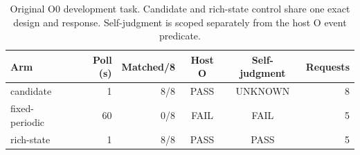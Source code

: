 \begin{table}[htbp]
\centering\small
\caption{Original O0 development task. Candidate and rich-state control share one exact design and response. Self-judgment is scoped separately from the host O event predicate.}
\label{tab:o0}
\begin{tabular}{@{}lrrccr@{}}\toprule
Arm & Poll (s) & Matched/8 & Host O & Self-judgment & Requests \\\midrule
candidate & 1 & 8/8 & PASS & UNKNOWN & 8 \\
fixed-periodic & 60 & 0/8 & FAIL & FAIL & 5 \\
rich-state & 1 & 8/8 & PASS & PASS & 5 \\
\bottomrule\end{tabular}
\end{table}
